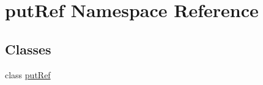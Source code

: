 \hypertarget{namespaceputRef}{\section{put\-Ref \-Namespace \-Reference}
\label{namespaceputRef}
}
\subsection*{\-Classes}
\begin{DoxyCompactItemize}
\item 
class \hyperlink{classputRef_1_1putRef}{put\-Ref}
\end{DoxyCompactItemize}
